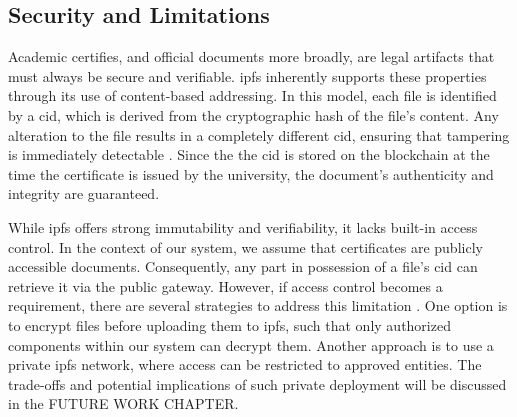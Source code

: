 \subsection{Security and Limitations}
Academic certifies, and official documents more broadly, are legal artifacts that must always be secure and verifiable. \acrshort{ipfs} inherently supports these properties through its use of content-based addressing. In this model, each file is identified by a \acrshort{cid}, which is derived from the cryptographic hash of the file's content. Any alteration to the file results in a completely different \acrshort{cid}, ensuring that tampering is immediately detectable \cite{benet2014ipfscontentaddressed}. Since the the \acrshort{cid} is stored on the blockchain at the time the certificate is issued by the university, the document's authenticity and integrity are guaranteed.

While \acrshort{ipfs} offers strong immutability and verifiability, it lacks built-in access control. In the context of our system, we assume that certificates are publicly accessible documents. Consequently, any part in possession of a file's \acrshort{cid} can retrieve it via the public gateway. However, if access control becomes a requirement, there are several strategies to address this limitation \cite{barbaraanrealaura2021datapersistence}. One option is to encrypt files before uploading them to \acrshort{ipfs}, such that only authorized components within our system can decrypt them. Another approach is to use a private \acrshort{ipfs} network, where access can be restricted to approved entities. The trade-offs and potential implications of such private deployment will be discussed in the FUTURE WORK CHAPTER.

